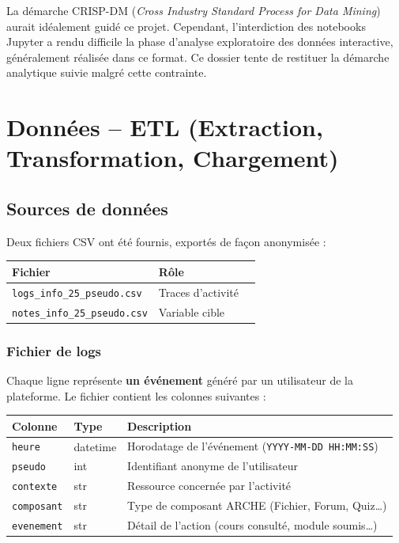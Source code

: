 \documentclass[12pt, a4paper, french]{report}
\begin{document}
\begin{notebox}
La démarche CRISP-DM (\textit{Cross Industry Standard Process for Data Mining}) aurait idéalement guidé ce projet. Cependant, l'interdiction des notebooks Jupyter a rendu difficile la phase d'analyse exploratoire des données interactive, généralement réalisée dans ce format. Ce dossier tente de restituer la démarche analytique suivie malgré cette contrainte.
\end{notebox}

\chapter{Données -- ETL (Extraction, Transformation, Chargement)}

\section{Sources de données}

Deux fichiers CSV ont été fournis, exportés de façon anonymisée :

\begin{center}
\begin{tabular}{lll}
\toprule
\textbf{Fichier} & \textbf{Rôle}\\
\midrule
\texttt{logs\_info\_25\_pseudo.csv} & Traces d'activité\\
\texttt{notes\_info\_25\_pseudo.csv} & Variable cible\\
\bottomrule
\end{tabular}
\end{center}

\subsection{Fichier de logs}

Chaque ligne représente \textbf{un événement} généré par un utilisateur de la plateforme.
Le fichier contient les colonnes suivantes :

\begin{center}
\begin{tabular}{lll}
\toprule
\textbf{Colonne} & \textbf{Type} & \textbf{Description}\\
\midrule
\texttt{heure}     & datetime & Horodatage de l'événement (\texttt{YYYY-MM-DD HH:MM:SS})\\
\texttt{pseudo}    & int      & Identifiant anonyme de l'utilisateur\\
\texttt{contexte}  & str      & Ressource concernée par l'activité\\
\texttt{composant} & str      & Type de composant ARCHE (Fichier, Forum, Quiz\ldots)\\
\texttt{evenement} & str      & Détail de l'action (cours consulté, module soumis\ldots)\\
\bottomrule
\end{tabular}
\end{center}
\end{document}
